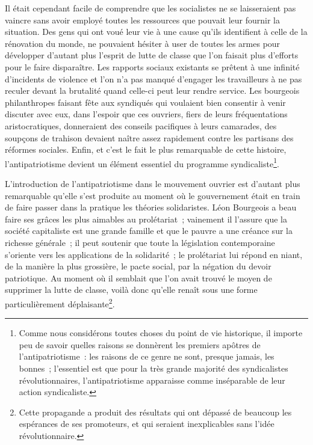 \documentclass[french,twoside]{book} %
\begin{document}
Il était cependant facile de comprendre que les socialistes ne se laisseraient pas vaincre sans avoir employé toutes les ressources que pouvait leur fournir la situation. Des gens qui ont voué leur vie à une cause qu’ils identifient à celle de la rénovation du monde, ne pouvaient hésiter à user de toutes les armes pour développer d’autant plus l’esprit de lutte de classe que l’on faisait plus d’efforts pour le faire disparaître. Les rapports sociaux existants se prêtent à une infinité d’incidents de violence et l’on n’a pas manqué d’engager les travailleurs à ne pas reculer devant la brutalité quand celle-ci peut leur rendre service. Les bourgeois philanthropes faisant fête aux syndiqués qui voulaient bien consentir à venir discuter avec eux, dans l’espoir que ces ouvriers, fiers de leurs fréquentations aristocratiques, donneraient des conseils pacifiques à leurs camarades, des soupçons de trahison devaient naître assez rapidement contre les partisans des réformes sociales. Enfin, et c’est le fait le plus remarquable de cette histoire, l’antipatriotisme devient un élément essentiel du programme syndicaliste\footnote{ \noindent Comme nous considérons toutes choses du point de vie historique, il importe peu de savoir quelles raisons se donnèrent les premiers apôtres de l’antipatriotisme : les raisons de ce genre ne sont, presque jamais, les bonnes ; l’essentiel est que pour la très grande majorité des syndicalistes révolutionnaires, l’antipatriotisme apparaisse comme inséparable de leur action syndicaliste.
 }.\par
 L’introduction de l’antipatriotisme dans le mouvement ouvrier est d’autant plus remarquable qu’elle s’est produite au moment où le gouvernement était en train de faire passer dans la pratique les théories solidaristes. Léon Bourgeois a beau faire ses grâces les plus aimables au prolétariat ; vainement il l’assure que la société capitaliste est une grande famille et que le pauvre a une créance sur la richesse générale ; il peut soutenir que toute la législation contemporaine s’oriente vers les applications de la solidarité ; le prolétariat lui répond en niant, de la manière la plus grossière, le pacte social, par la négation du devoir patriotique. Au moment où il semblait que l’on avait trouvé le moyen de supprimer la lutte de classe, voilà donc qu’elle renaît sous une forme particulièrement déplaisante\footnote{ \noindent Cette propagande a produit des résultats qui ont dépassé de beaucoup les espérances de ses promoteurs, et qui seraient inexplicables sans l’idée révolutionnaire.
 }.\par
\end{document}
